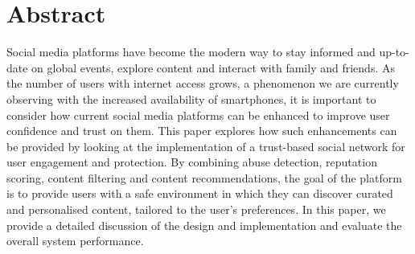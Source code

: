 \chapter*{Abstract}
Social media platforms have become the modern way to stay informed and up-to-date on global events, explore content and interact with family and friends. As the number of users with internet access grows, a phenomenon we are currently observing with the increased availability of smartphones, it is important to consider how current social media platforms can be enhanced to improve user confidence and trust on them. This paper explores how such enhancements can be provided by looking at the implementation of a trust-based social network for user engagement and protection. By combining abuse detection, reputation scoring, content filtering and content recommendations, the goal of the platform is to provide users with a safe environment in which they can discover curated and personalised content, tailored to the user's preferences. In this paper, we provide a detailed discussion of the design and implementation and evaluate the overall system performance. 
